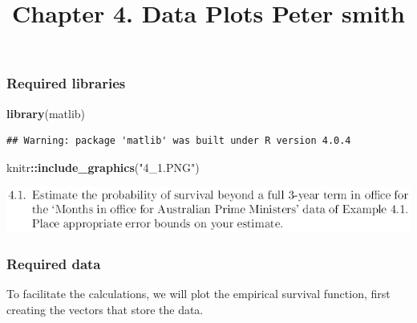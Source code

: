 \documentclass[
]{article}
\title{Chapter 4. Data Plots Peter smith}
\author{}
\date{\vspace{-2.5em}}
\newenvironment{Shaded}{\begin{snugshade}}{\end{snugshade}}
\newcommand{\KeywordTok}[1]{\textcolor[rgb]{0.13,0.29,0.53}{\textbf{#1}}}
\newcommand{\NormalTok}[1]{#1}
\newcommand{\OperatorTok}[1]{\textcolor[rgb]{0.81,0.36,0.00}{\textbf{#1}}}
\newcommand{\StringTok}[1]{\textcolor[rgb]{0.31,0.60,0.02}{#1}}
\begin{document}
\maketitle

\hypertarget{required-libraries}{%
\subsubsection{Required libraries}\label{required-libraries}}

\begin{Shaded}
\begin{Highlighting}[]
\KeywordTok{library}\NormalTok{(matlib)}
\end{Highlighting}
\end{Shaded}

\begin{verbatim}
## Warning: package 'matlib' was built under R version 4.0.4
\end{verbatim}

\begin{Shaded}
\begin{Highlighting}[]
\NormalTok{knitr}\OperatorTok{::}\KeywordTok{include_graphics}\NormalTok{(}\StringTok{"4_1.PNG"}\NormalTok{)}
\end{Highlighting}
\end{Shaded}

\includegraphics[width=9.19in]{4_1}

\hypertarget{required-data}{%
\subsubsection{Required data}\label{required-data}}

To facilitate the calculations, we will plot the empirical survival
function, first creating the vectors that store the data.
\end{document}
